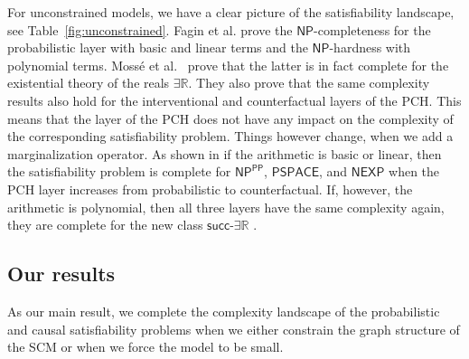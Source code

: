 \documentclass[a4paper,UKenglish,cleveref, autoref, thm-restate]{lipics-v2021}
\newcommand{\IR}{\mathbb{R}}
\newcommand{\existsR}{\ensuremath{\mathsf{\exists\IR}}}
\newcommand{\succR}{\ensuremath{\mathsf{succ\text{-}\exists\IR}}}
\newcommand{\NP}{\ensuremath{\mathsf{NP}}}
\newcommand{\NEXP}{\ensuremath{\mathsf{NEXP}}}
\newcommand{\PSPACE}{\ensuremath{\mathsf{PSPACE}}}
\newcommand{\ccPP}{\ensuremath{\mathsf{PP}}}
\begin{document}
For unconstrained models, we have a clear picture of the satisfiability landscape, see Table~\ref{fig:unconstrained}. Fagin et al. \cite{fagin1990logic} prove the $\NP$-completeness for the probabilistic layer with basic and linear terms and the $\NP$-hardness with polynomial terms. Moss{\'e} et al.\ \cite{ibeling2022mosse} prove that the latter is in fact complete for the existential theory of the reals $\existsR$. They also prove that the same complexity results also hold for the interventional and counterfactual layers of the PCH. This means that the layer of the PCH does not have any impact on the complexity of the corresponding satisfiability problem. Things however change, when we add a marginalization operator. As shown in \cite{doerflerICLR2025} if the arithmetic is basic or linear, then the satisfiability problem is complete for $\NP^{\ccPP}$, $\PSPACE$, and $\NEXP$ when the PCH layer increases from probabilistic to counterfactual. If, however, the arithmetic is polynomial, then all three layers have the same complexity again, they are complete for the new class $\succR$ \citep{zander2023ijcai,ibeling2024probabilistic,doerflerICLR2025}.


\subsection{Our results}

As our main result, we complete the complexity landscape of the probabilistic and causal satisfiability problems when we either constrain the graph structure of the SCM or when we force the model to be small.
\end{document}
